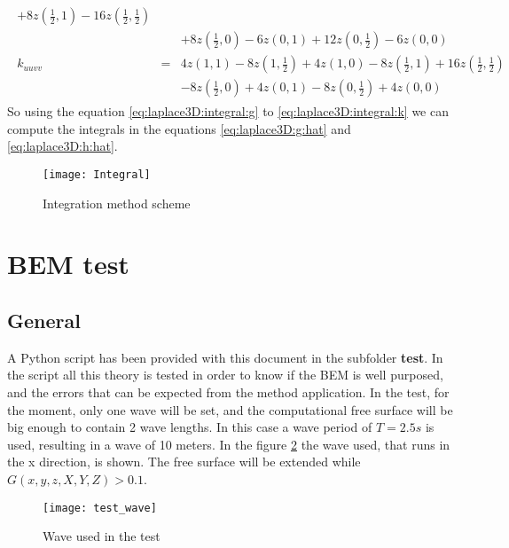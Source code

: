 \begin{eqnarray}
\begin{array}{lcl}
	              + 8 z \left( \frac{1}{2},1 \right) - 16 z \left( \frac{1}{2},\frac{1}{2} \right)
	        \\ & & 
	              + 8 z \left( \frac{1}{2},0 \right) - 6 z \left( 0,1 \right)
	              + 12 z \left( 0,\frac{1}{2} \right) - 6 z \left( 0,0 \right)
	\\
	k_{uuvv} & = & 4 z \left( 1,1 \right) - 8 z \left( 1,\frac{1}{2} \right) + 4 z \left( 1,0 \right)
	               - 8 z \left( \frac{1}{2},1 \right) + 16 z \left( \frac{1}{2},\frac{1}{2} \right)
	        \\ & & 
	               - 8 z \left( \frac{1}{2},0 \right) + 4 z \left( 0,1 \right)
	               - 8 z \left( 0,\frac{1}{2} \right) + 4 z \left( 0,0 \right)
	\end{array}
\end{eqnarray}
%
So using the equation \ref{eq:laplace3D:integral:g} to \ref{eq:laplace3D:integral:k}
we can compute the integrals in the equations \ref{eq:laplace3D:g:hat} and
\ref{eq:laplace3D:h:hat}.
%
\begin{figure}[ht!]
  \centering
  \texttt{[image: Integral]}
  \caption{Integration method scheme}
  \label{fig:ss:laplace3D:integral}
\end{figure}
%
\section{BEM test}
\label{ss:laplace3D:test}
%
\subsection{General}
\label{sss:laplace3D:test:general}
%
A Python script has been provided with this document in the subfolder \textbf{test}.
In the script  all this theory is tested in order to know if the BEM is well purposed,
and the errors that can be expected from the method application.\rc
%
In the test, for the moment, only one wave will be set, and the computational free
surface will be big enough to contain 2 wave lengths. In this case a wave period
of $T = 2.5 s$ is used, resulting in a wave of 10 meters.\rc
%
In the figure \ref{fig:laplace3D:test:wave} the wave used, that runs in the x direction,
is shown. The free surface will be extended while $G(x,y,z,X,Y,Z) > 0.1$.
%
\begin{figure}[ht!]
  \centering
  \texttt{[image: test\_wave]}
  \caption{Wave used in the test}
  \label{fig:laplace3D:test:wave}
\end{figure}
%
